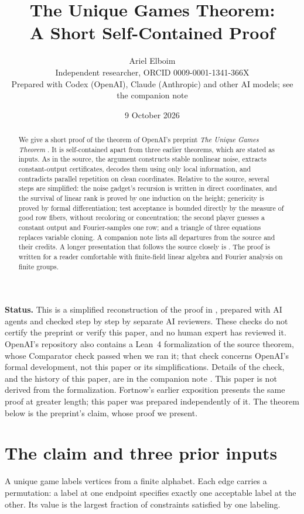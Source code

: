 \documentclass[11pt]{article}
\title{The Unique Games Theorem:\\ A Short Self-Contained Proof}
\author{Ariel Elboim\\\small Independent researcher, ORCID 0009-0001-1341-366X\\\small Prepared with Codex (OpenAI), Claude (Anthropic) and other AI models; see the companion note}
\date{9 October 2026}
\begin{document}
\maketitle
\begin{abstract}
We give a short proof of the theorem of OpenAI's preprint \emph{The
Unique Games Theorem} \cite{UGT}. It is self-contained apart from three
earlier theorems, which are stated as inputs. As in the source, the
argument constructs stable nonlinear noise, extracts constant-output
certificates, decodes them using only local information, and contradicts
parallel repetition on clean coordinates. Relative to the source,
several steps are simplified: the noise gadget's recursion is written in
direct coordinates, and the survival of linear rank is proved by one
induction on the height; genericity is proved by formal differentiation;
test acceptance is bounded directly by the measure of good row fibers,
without recoloring or concentration; the second player guesses a
constant output and Fourier-samples one row; and a triangle of three
equations replaces variable cloning. A companion note \cite{Notes} lists
all departures from the source and their credits. A longer presentation
that follows the source closely is \cite{Elboim}. The proof is written
for a reader comfortable with finite-field linear algebra and Fourier
analysis on finite groups.
\end{abstract}

\noindent\textbf{Status.}
This is a simplified reconstruction of the proof in \cite{UGT}, prepared
with AI agents and checked step by step by separate AI reviewers. These
checks do not certify the preprint or verify this paper, and no human
expert has reviewed it. OpenAI's repository also contains a Lean~4
formalization of the source theorem, whose Comparator check passed when
we ran it; that check concerns OpenAI's formal development, not this
paper or its simplifications. Details of the check, and the history of
this paper, are in the companion note \cite{Notes}. This paper is not
derived from the formalization. Fortnow's earlier exposition
\cite{Fortnow} presents the same proof at greater length; this paper was
prepared independently of it. The theorem below is the preprint's claim,
whose proof we present.

\section{The claim and three prior inputs}

A unique game labels vertices from a finite alphabet. Each edge carries
a permutation: a label at one endpoint specifies exactly one acceptable
label at the other. Its value is the largest fraction of constraints
satisfied by one labeling.
\end{document}
